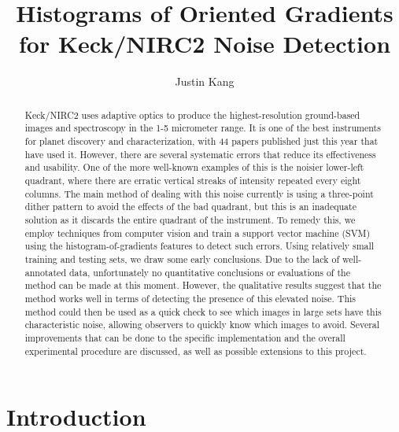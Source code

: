 \documentclass[twocolumn,longauthor]{aastex61}
\begin{document}
\title{Histograms of Oriented Gradients for Keck/NIRC2 Noise Detection}


\author{Justin Kang}



\begin{abstract}
\noindent Keck/NIRC2 uses adaptive optics to produce the highest-resolution ground-based images and spectroscopy in the 1-5 micrometer range. It is one of the best instruments for planet discovery and characterization, with 44 papers published just this year that have used it. However, there are several systematic errors that reduce its effectiveness and usability. One of the more well-known examples of this is the noisier lower-left quadrant, where there are erratic vertical streaks of intensity repeated every eight columns. The main method of dealing with this noise currently is using a three-point dither pattern to avoid the effects of the bad quadrant, but this is an inadequate solution as it discards the entire quadrant of the instrument. To remedy this, we employ techniques from computer vision and train a support vector machine (SVM) using the histogram-of-gradients features to detect such errors. Using relatively small training and testing sets, we draw some early conclusions. Due to the lack of well-annotated data, unfortunately no quantitative conclusions or evaluations of the method can be made at this moment. However, the qualitative results suggest that the method works well in terms of detecting the presence of this elevated noise. This method could then be used as a quick check to see which images in large sets have this characteristic noise, allowing observers to quickly know which images to avoid. Several improvements that can be done to the specific implementation and the overall experimental procedure are discussed, as well as possible extensions to this project. 
\end{abstract}



\section{Introduction} \label{sec:intro}
\end{document}
